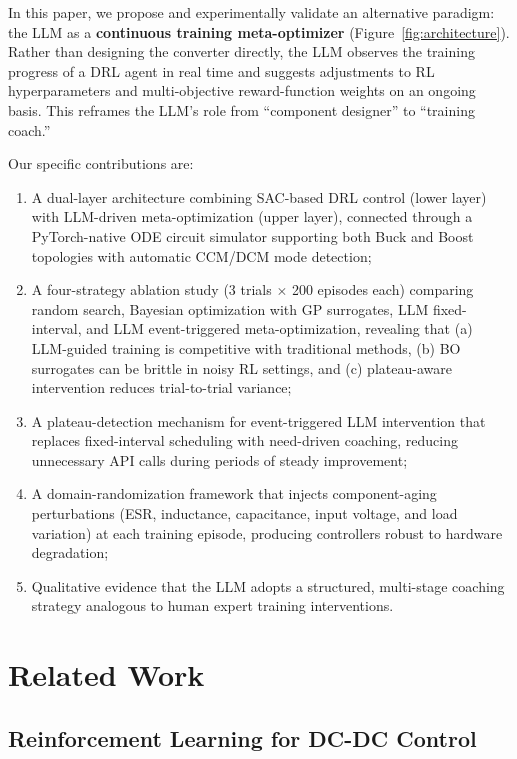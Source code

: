 \documentclass[11pt,a4paper]{article}
\begin{document}
In this paper, we propose and experimentally validate an alternative paradigm:
the LLM as a \textbf{continuous training meta-optimizer} (Figure~\ref{fig:architecture}).
Rather than designing the converter directly, the LLM observes the training
progress of a DRL agent in real time and suggests adjustments to RL hyperparameters
and multi-objective reward-function weights on an ongoing basis.
This reframes the LLM's role from ``component designer'' to ``training coach.''

Our specific contributions are:
\begin{enumerate}
    \item A dual-layer architecture combining SAC-based DRL control (lower layer)
    with LLM-driven meta-optimization (upper layer), connected through a
    PyTorch-native ODE circuit simulator supporting both Buck and Boost
    topologies with automatic CCM/DCM mode detection;
    \item A four-strategy ablation study (3 trials $\times$ 200 episodes each)
    comparing random search, Bayesian optimization with GP surrogates, LLM
    fixed-interval, and LLM event-triggered meta-optimization, revealing that
    (a) LLM-guided training is competitive with traditional methods, (b) BO
    surrogates can be brittle in noisy RL settings, and (c) plateau-aware
    intervention reduces trial-to-trial variance;
    \item A plateau-detection mechanism for event-triggered LLM intervention that
    replaces fixed-interval scheduling with need-driven coaching, reducing
    unnecessary API calls during periods of steady improvement;
    \item A domain-randomization framework that injects component-aging
    perturbations (ESR, inductance, capacitance, input voltage, and load
    variation) at each training episode, producing controllers robust to
    hardware degradation;
    \item Qualitative evidence that the LLM adopts a structured, multi-stage
    coaching strategy analogous to human expert training interventions.
\end{enumerate}

\section{Related Work}

\subsection{Reinforcement Learning for DC-DC Control}
\end{document}
